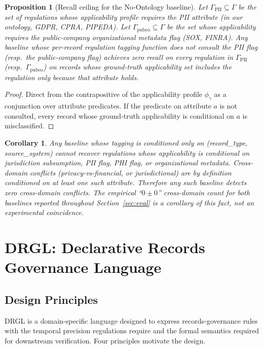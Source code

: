 \documentclass{ieeeaccess}
\newtheorem{proposition}{Proposition}
\newtheorem{corollary}{Corollary}
\begin{document}
\begin{proposition}[Recall ceiling for the No-Ontology baseline]
Let $\Gamma_{\mathrm{PII}} \subseteq \Gamma$ be the set of regulations whose applicability profile requires the PII attribute (in our ontology, GDPR, CPRA, PIPEDA). Let $\Gamma_{\mathrm{pubco}} \subseteq \Gamma$ be the set whose applicability requires the public-company organizational metadata flag (SOX, FINRA). Any baseline whose per-record regulation tagging function does not consult the PII flag (resp.\ the public-company flag) achieves zero recall on every regulation in $\Gamma_{\mathrm{PII}}$ (resp.\ $\Gamma_{\mathrm{pubco}}$) on records whose ground-truth applicability set includes the regulation only because that attribute holds.
\end{proposition}

\begin{proof}
Direct from the contrapositive of the applicability profile $\phi_\gamma$ as a conjunction over attribute predicates. If the predicate on attribute $a$ is not consulted, every record whose ground-truth applicability is conditional on $a$ is misclassified.
\end{proof}

\begin{corollary}
Any baseline whose tagging is conditioned only on (record\_type, source\_system) cannot recover regulations whose applicability is conditional on jurisdiction subsumption, PII flag, PHI flag, or organizational metadata. Cross-domain conflicts (privacy-vs-financial, or jurisdictional) are by definition conditioned on at least one such attribute. Therefore any such baseline detects zero cross-domain conflicts. The empirical ``$0 \pm 0$'' cross-domain count for both baselines reported throughout Section~\ref{sec:eval} is a corollary of this fact, not an experimental coincidence.
\end{corollary}

\section{DRGL: Declarative Records Governance Language}
\label{sec:drgl}

\subsection{Design Principles}

DRGL is a domain-specific language designed to express records-governance rules with the temporal precision regulations require and the formal semantics required for downstream verification. Four principles motivate the design.
\end{document}
